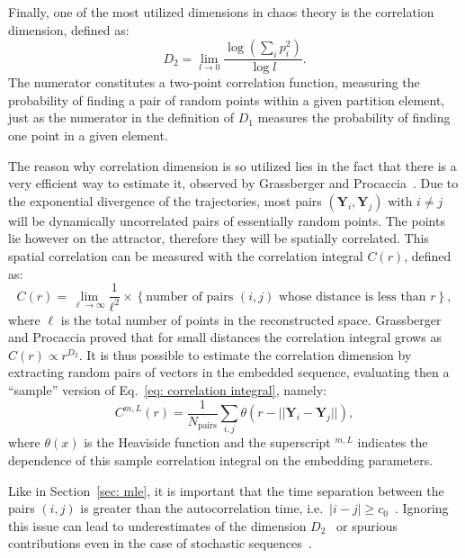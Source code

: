 Finally, one of the most utilized dimensions in chaos theory is the correlation dimension, defined as:
\begin{equation}
    \label{eq: D_2}
    D_2=\lim_{l\rightarrow0}\frac{\log(\sum_i p_i^2)}{\log l}.
\end{equation}
The numerator constitutes a two-point correlation function, measuring the probability of finding a
pair of random points within a given partition element, just as the numerator in the definition of
$D_1$ measures the probability of finding one point in a given element.

The reason why correlation dimension is so utilized lies in the fact that there is a very
efficient way to estimate it, observed by Grassberger and Procaccia~\cite{ref:grassberger1983measuring}.
Due to the exponential divergence of the trajectories, most pairs
$(\mathbf{Y}_i,\mathbf{Y}_j)$ with $i\neq j$ will be dynamically uncorrelated
pairs of essentially random points. The points lie however on the attractor, therefore they will be
spatially correlated. This spatial correlation can be measured with the correlation integral
$C(r)$, defined as:
\begin{equation}
    \label{eq: correlation integral}
    C(r) = \lim_{\ell\rightarrow\infty} \frac{1}{\ell^2}\times\left\{
        \text{number of pairs $(i,j)$ whose distance is less than $r$}
    \right\},
\end{equation}
where $\ell$ is the total number of points in the reconstructed space.
Grassberger and Procaccia proved that for small distances the correlation integral grows as
$C(r)\propto r^{D_2}$. It is thus possible to estimate the correlation dimension
by extracting random pairs of vectors in the embedded sequence, evaluating then a ``sample''
version of Eq.~\ref{eq: correlation integral}, namely:
\begin{equation}
    \label{eq: sample correlation integral}
    C^{m,L}(r)=\frac{1}{N_{\text{pairs}}}\sum_{i,j}\theta\left(
        r-||\mathbf{Y}_i-\mathbf{Y}_j||
    \right),
\end{equation}
where $\theta(x)$ is the Heaviside function and the superscript $^{m,L}$ indicates the dependence of this
sample correlation integral on the embedding parameters. 

Like in Section~\ref{sec: mle}, it is important that the time separation between
the pairs $(i,j)$ is greater than the autocorrelation time, i.e.\ $|i-j|\geq c_0$~\cite{ref:theiler1986spurious,ref:albano1995kolmogorov}.
Ignoring this issue can lead to underestimates of the dimension $D_2$~\cite{ref:theiler1986spurious}
or spurious contributions even in the case of stochastic sequences~\cite{ref:osborne1989finite}.

